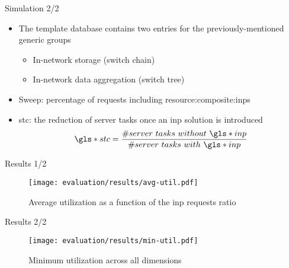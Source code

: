 \begin{frame}{Simulation 2/2}
    \begin{itemize}
        \item The template database contains two entries for the previously-mentioned generic groups
        \begin{itemize}
            \item In-network storage (switch chain)
            \item In-network data aggregation (switch tree)
        \end{itemize}
        \item Sweep: percentage of requests including \glspl{resource:composite:inp}
        \item \gls*{stc}: the reduction of server tasks once an \gls*{inp} solution is introduced
        \vspace{3mm}
        \begin{equation*}
            \gls*{stc}=\dfrac{\#server\ tasks\ without\ \gls*{inp}}{\#server\ tasks\ with\ \gls*{inp}}
        \end{equation*}
    \end{itemize}
\end{frame}


\begin{frame}{Results 1/2}
    \vspace{4mm}
    \begin{figure}
        \captionsetup{font=footnotesize}
        \texttt{[image: evaluation/results/avg-util.pdf]}
        \vspace{2mm}
        \caption{Average  utilization as a function of the \gls*{inp} requests ratio}
    \end{figure}
\end{frame}

\begin{frame}{Results 2/2}
    \vspace{2mm}
    \begin{figure}
        \captionsetup{font=footnotesize}
        \texttt{[image: evaluation/results/min-util.pdf]}
        \vspace{2mm}
        \caption{Minimum  utilization across all dimensions}
    \end{figure}
\end{frame}
